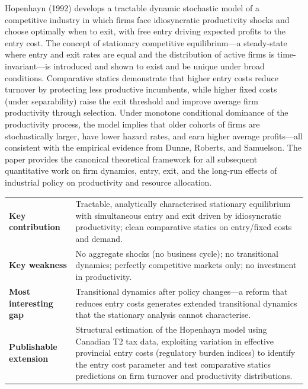 Hopenhayn (1992) develops a tractable dynamic stochastic model of a
competitive industry in which firms face idiosyncratic productivity shocks and
choose optimally when to exit, with free entry driving expected profits to the
entry cost. The concept of stationary competitive equilibrium---a steady-state
where entry and exit rates are equal and the distribution of active firms is
time-invariant---is introduced and shown to exist and be unique under broad
conditions. Comparative statics demonstrate that higher entry costs reduce
turnover by protecting less productive incumbents, while higher fixed costs
(under separability) raise the exit threshold and improve average firm
productivity through selection. Under monotone conditional dominance of the
productivity process, the model implies that older cohorts of firms are
stochastically larger, have lower hazard rates, and earn higher average
profits---all consistent with the empirical evidence from Dunne, Roberts, and
Samuelson. The paper provides the canonical theoretical framework for all
subsequent quantitative work on firm dynamics, entry, exit, and the long-run
effects of industrial policy on productivity and resource allocation.

\vspace{6pt}
\begin{quickref}
\begin{tabularx}{\linewidth}{@{}lX@{}}
\textbf{Key contribution} &
  Tractable, analytically characterised stationary equilibrium with
  simultaneous entry and exit driven by idiosyncratic productivity; clean
  comparative statics on entry/fixed costs and demand. \\[4pt]
\textbf{Key weakness} &
  No aggregate shocks (no business cycle); no transitional dynamics;
  perfectly competitive markets only; no investment in productivity. \\[4pt]
\textbf{Most interesting gap} &
  Transitional dynamics after policy changes---a reform that reduces entry
  costs generates extended transitional dynamics that the stationary analysis
  cannot characterise. \\[4pt]
\textbf{Publishable extension} &
  Structural estimation of the Hopenhayn model using Canadian T2 tax data,
  exploiting variation in effective provincial entry costs (regulatory burden
  indices) to identify the entry cost parameter and test comparative statics
  predictions on firm turnover and productivity distributions.
\end{tabularx}
\end{quickref}

